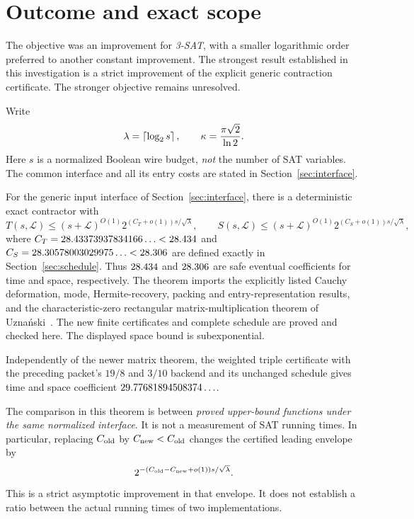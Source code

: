 \section{Outcome and exact scope}
\label{sec:outcome}

The objective was an improvement for \emph{3-SAT}, with a smaller
logarithmic order preferred to another constant improvement. The strongest
result established in this investigation is a strict improvement of the
explicit generic contraction certificate. The stronger objective remains
unresolved.

Write
\[
 \lambda=\left\lceil\log_2s\right\rceil,\qquad
 \kappa=\frac{\pi\sqrt2}{\ln2}.
\]
Here $s$ is a normalized Boolean wire budget, \emph{not} the number of SAT
variables. The common interface and all its entry costs are stated in
Section~\ref{sec:interface}.

\begin{theorem}\label{thm:main}
For the generic input interface of Section~\ref{sec:interface}, there is
a deterministic exact contractor with
\[
 T(s,\mathcal L)\le (s+\mathcal L)^{O(1)}
       2^{(C_T+o(1))s/\sqrt\lambda},\qquad
 S(s,\mathcal L)\le (s+\mathcal L)^{O(1)}
       2^{(C_S+o(1))s/\sqrt\lambda},
\]
where $C_T=28.43373937834166\ldots<28.434$ and $C_S=28.30578003029975\ldots<28.306$ are defined exactly
in Section~\ref{sec:schedule}. Thus $28.434$ and $28.306$ are safe
eventual coefficients for time and space, respectively.
The theorem imports the explicitly listed Cauchy deformation, mode,
Hermite-recovery, packing and entry-representation results, and the
characteristic-zero rectangular matrix-multiplication theorem of
Uzna\'nski~\cite{uznanski}. The new finite certificates and complete
schedule are proved and checked here. The displayed space bound is
subexponential.

Independently of the newer matrix theorem, the weighted triple certificate
with the preceding packet's $19/8$ and $3/10$ backend and its unchanged
schedule gives time and space coefficient $29.77681894508374\ldots$.
\end{theorem}

The comparison in this theorem is between \emph{proved upper-bound
functions under the same normalized interface}. It is not a measurement
of SAT running times. In particular, replacing $C_{\rm old}$ by
$C_{\rm new}<C_{\rm old}$ changes the certified leading envelope by
\[
 2^{-(C_{\rm old}-C_{\rm new}+o(1))s/\sqrt\lambda}.
\]
This is a strict asymptotic improvement in that envelope. It does not
establish a ratio between the actual running times of two implementations.

